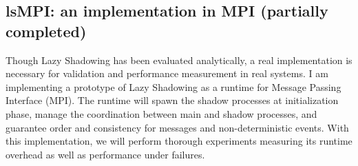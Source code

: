 %

\subsection{lsMPI: an implementation in MPI (partially completed)}

Though Lazy Shadowing has been evaluated analytically, a real implementation 
is necessary for validation and performance measurement in real systems. I am implementing a prototype of Lazy 
Shadowing as a runtime for Message Passing Interface (MPI). %
The runtime will spawn 
the shadow processes at initialization phase, manage the coordination between main and shadow processes, 
and guarantee order and consistency for messages and non-deterministic events. With this implementation, we will perform thorough 
experiments measuring its runtime overhead as well as performance under failures.

